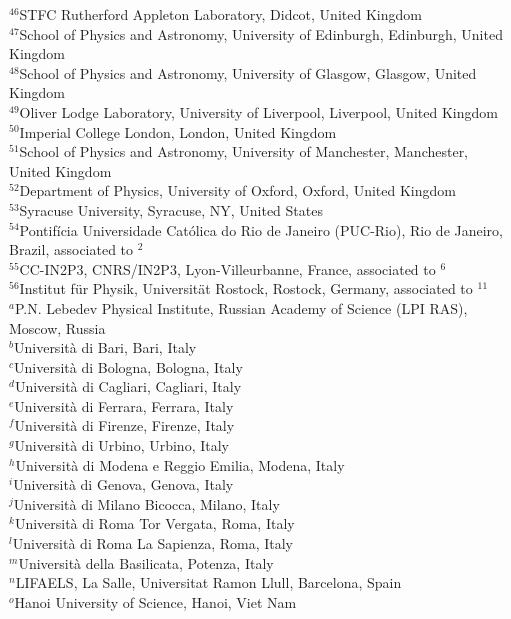 \documentclass[12pt,a4paper]{article}
\begin{document}
\begin{titlepage}
\begin{center}
\begin{flushleft}
{$ ^{46}$STFC Rutherford Appleton Laboratory, Didcot, United Kingdom\\
$ ^{47}$School of Physics and Astronomy, University of Edinburgh, Edinburgh, United Kingdom\\
$ ^{48}$School of Physics and Astronomy, University of Glasgow, Glasgow, United Kingdom\\
$ ^{49}$Oliver Lodge Laboratory, University of Liverpool, Liverpool, United Kingdom\\
$ ^{50}$Imperial College London, London, United Kingdom\\
$ ^{51}$School of Physics and Astronomy, University of Manchester, Manchester, United Kingdom\\
$ ^{52}$Department of Physics, University of Oxford, Oxford, United Kingdom\\
$ ^{53}$Syracuse University, Syracuse, NY, United States\\
$ ^{54}$Pontif\'{i}cia Universidade Cat\'{o}lica do Rio de Janeiro (PUC-Rio), Rio de Janeiro, Brazil, associated to $^{2}$\\
$ ^{55}$CC-IN2P3, CNRS/IN2P3, Lyon-Villeurbanne, France, associated to $^{6}$\\
$ ^{56}$Institut f\"{u}r Physik, Universit\"{a}t Rostock, Rostock, Germany, associated to $^{11}$\\
\bigskip
$ ^{a}$P.N. Lebedev Physical Institute, Russian Academy of Science (LPI RAS), Moscow, Russia\\
$ ^{b}$Universit\`{a} di Bari, Bari, Italy\\
$ ^{c}$Universit\`{a} di Bologna, Bologna, Italy\\
$ ^{d}$Universit\`{a} di Cagliari, Cagliari, Italy\\
$ ^{e}$Universit\`{a} di Ferrara, Ferrara, Italy\\
$ ^{f}$Universit\`{a} di Firenze, Firenze, Italy\\
$ ^{g}$Universit\`{a} di Urbino, Urbino, Italy\\
$ ^{h}$Universit\`{a} di Modena e Reggio Emilia, Modena, Italy\\
$ ^{i}$Universit\`{a} di Genova, Genova, Italy\\
$ ^{j}$Universit\`{a} di Milano Bicocca, Milano, Italy\\
$ ^{k}$Universit\`{a} di Roma Tor Vergata, Roma, Italy\\
$ ^{l}$Universit\`{a} di Roma La Sapienza, Roma, Italy\\
$ ^{m}$Universit\`{a} della Basilicata, Potenza, Italy\\
$ ^{n}$LIFAELS, La Salle, Universitat Ramon Llull, Barcelona, Spain\\
$ ^{o}$Hanoi University of Science, Hanoi, Viet Nam\\
}
\end{flushleft}


\end{center}

\end{titlepage}
\end{document}
